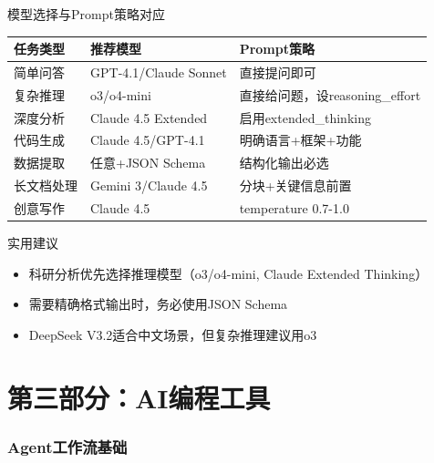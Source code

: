 \documentclass[aspectratio=169,11pt]{beamer}
\begin{document}
\begin{frame}{模型选择与Prompt策略对应}
    \begin{center}
    \small
    \begin{tabular}{p{2.8cm}p{3.2cm}p{3.5cm}}
        \toprule
        \textbf{任务类型} & \textbf{推荐模型} & \textbf{Prompt策略} \\
        \midrule
        简单问答 & GPT-4.1/Claude Sonnet & 直接提问即可 \\
        \addlinespace
        复杂推理 & o3/o4-mini & 直接给问题，设reasoning\_effort \\
        \addlinespace
        深度分析 & Claude 4.5 Extended & 启用extended\_thinking \\
        \addlinespace
        代码生成 & Claude 4.5/GPT-4.1 & 明确语言+框架+功能 \\
        \addlinespace
        数据提取 & 任意+JSON Schema & 结构化输出必选 \\
        \addlinespace
        长文档处理 & Gemini 3/Claude 4.5 & 分块+关键信息前置 \\
        \addlinespace
        创意写作 & Claude 4.5 & temperature 0.7-1.0 \\
        \bottomrule
    \end{tabular}
    \end{center}
    
    \vspace{0.3cm}
    \begin{block}{实用建议}
        \begin{itemize}
            \item 科研分析优先选择推理模型（o3/o4-mini, Claude Extended Thinking）
            \item 需要精确格式输出时，务必使用JSON Schema
            \item DeepSeek V3.2适合中文场景，但复杂推理建议用o3
        \end{itemize}
    \end{block}
\end{frame}

\part{第三部分：AI编程工具}

\section{Agent工作流基础}
\end{document}
